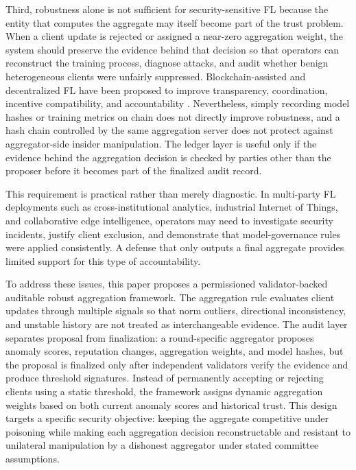 \documentclass[preprint,12pt]{elsarticle}
\begin{document}
Third, robustness alone is not sufficient for security-sensitive FL because the entity that computes the aggregate may itself become part of the trust problem. When a client update is rejected or assigned a near-zero aggregation weight, the system should preserve the evidence behind that decision so that operators can reconstruct the training process, diagnose attacks, and audit whether benign heterogeneous clients were unfairly suppressed. Blockchain-assisted and decentralized FL have been proposed to improve transparency, coordination, incentive compatibility, and accountability \citep{lu2020blockchain,nguyen2021blockchainedge,dong2024blockchain,zhang2024bitfl,ren2024bpfl,awan2022blockchainflsurvey,yuan2024dflsurvey,jiang2023blockflsurvey}. Nevertheless, simply recording model hashes or training metrics on chain does not directly improve robustness, and a hash chain controlled by the same aggregation server does not protect against aggregator-side insider manipulation. The ledger layer is useful only if the evidence behind the aggregation decision is checked by parties other than the proposer before it becomes part of the finalized audit record.

This requirement is practical rather than merely diagnostic. In multi-party FL deployments such as cross-institutional analytics, industrial Internet of Things, and collaborative edge intelligence, operators may need to investigate security incidents, justify client exclusion, and demonstrate that model-governance rules were applied consistently. A defense that only outputs a final aggregate provides limited support for this type of accountability.

To address these issues, this paper proposes a permissioned validator-backed auditable robust aggregation framework. The aggregation rule evaluates client updates through multiple signals so that norm outliers, directional inconsistency, and unstable history are not treated as interchangeable evidence. The audit layer separates proposal from finalization: a round-specific aggregator proposes anomaly scores, reputation changes, aggregation weights, and model hashes, but the proposal is finalized only after independent validators verify the evidence and produce threshold signatures. Instead of permanently accepting or rejecting clients using a static threshold, the framework assigns dynamic aggregation weights based on both current anomaly scores and historical trust. This design targets a specific security objective: keeping the aggregate competitive under poisoning while making each aggregation decision reconstructable and resistant to unilateral manipulation by a dishonest aggregator under stated committee assumptions.
\end{document}
